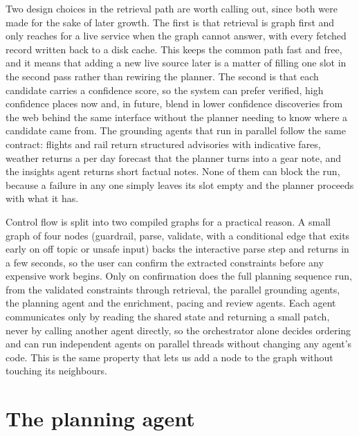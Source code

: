 \documentclass{ecai}
\begin{document}
Two design choices in the retrieval path are worth calling out, since both were
made for the sake of later growth. The first is that retrieval is graph first
and only reaches for a live service when the graph cannot answer, with every
fetched record written back to a disk cache. This keeps the common path fast
and free, and it means that adding a new live source later is a matter of
filling one slot in the second pass rather than rewiring the planner. The
second is that each candidate carries a confidence score, so the system can
prefer verified, high confidence places now and, in future, blend in lower
confidence discoveries from the web behind the same interface without the
planner needing to know where a candidate came from. The grounding agents that
run in parallel follow the same contract: flights and rail return structured
advisories with indicative fares, weather returns a per day forecast that the
planner turns into a gear note, and the insights agent returns short factual
notes. None of them can block the run, because a failure in any one simply
leaves its slot empty and the planner proceeds with what it has.

Control flow is split into two compiled graphs for a practical reason. A small
graph of four nodes (guardrail, parse, validate, with a conditional edge that
exits early on off topic or unsafe input) backs the interactive parse step and
returns in a few seconds, so the user can confirm the extracted constraints
before any expensive work begins. Only on confirmation does the full planning
sequence run, from the validated constraints through retrieval, the parallel
grounding agents, the planning agent and the enrichment, pacing and review
agents. Each agent communicates only by reading the shared state and returning
a small patch, never by calling another agent directly, so the orchestrator
alone decides ordering and can run independent agents on parallel threads
without changing any agent's code. This is the same property that lets us add a
node to the graph without touching its neighbours.

\section{The planning agent}
\label{sec:architect}
\end{document}
